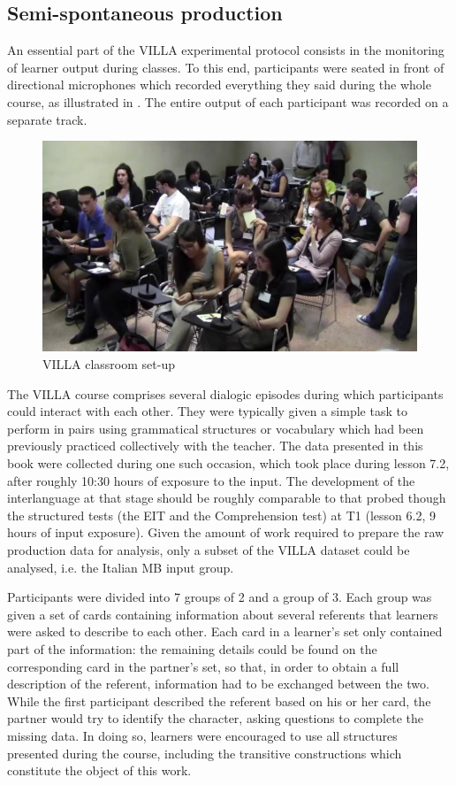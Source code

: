 \subsection{Semi-spontaneous production}\label{sec:02:4.5}

An essential part of the VILLA experimental protocol consists in the monitoring of learner output during classes. To this end, participants were seated in front of directional microphones which recorded everything they said during the whole course, as illustrated in . The entire output of each participant was recorded on a separate track.

\begin{figure}
    \includegraphics[width=\textwidth]{figures/02-8.pdf}
    \caption{VILLA classroom set-up}
    \label{fig:02:8}
\end{figure}

The VILLA course comprises several dialogic episodes during which participants could interact with each other. They were typically given a simple task to perform in pairs using grammatical structures or vocabulary which had been previously practiced collectively with the teacher. The data presented in this book were collected during one such occasion, which took place during lesson 7.2, after roughly 10:30 hours of exposure to the input. The development of the interlanguage at that stage should be roughly comparable to that probed though the structured tests (the EIT and the Comprehension test) at T1 (lesson 6.2, 9 hours of input exposure). Given the amount of work required to prepare the raw production data for analysis, only a subset of the VILLA dataset could be analysed, i.e. the Italian MB input group.

Participants were divided into 7 groups of 2 and a group of 3. Each group was given a set of cards containing information about several referents that learners were asked to describe to each other. Each card in a learner's set only contained part of the information: the remaining details could be found on the corresponding card in the partner's set, so that, in order to obtain a full description of the referent, information had to be exchanged between the two. While the first participant described the referent based on his or her card, the partner would try to identify the character, asking questions to complete the missing data. In doing so, learners were encouraged to use all structures presented during the course, including the transitive constructions which constitute the object of this work. 

